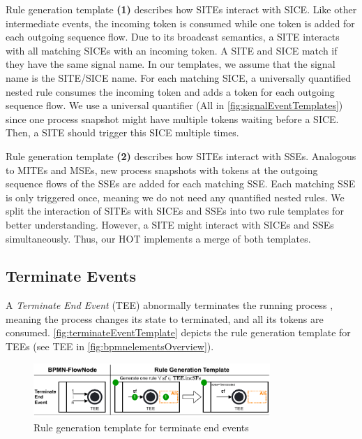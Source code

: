 \documentclass{lmcs} %
\begin{document}
Rule generation template \textbf{(1)} describes how SITEs interact with SICE.
Like other intermediate events, the incoming token is consumed while one token is added for each outgoing sequence flow.
Due to its broadcast semantics, a SITE interacts with all matching SICEs with an incoming token.
A SITE and SICE match if they have the same signal name.
In our templates, we assume that the signal name is the SITE/SICE name.
For each matching SICE, a universally quantified nested rule consumes the incoming token and adds a token for each outgoing sequence flow.
We use a universal quantifier (\textsf{All} in \autoref{fig:signalEventTemplates}) since one process snapshot might have multiple tokens waiting before a SICE.
Then, a SITE should trigger this SICE multiple times.

Rule generation template \textbf{(2)} describes how SITEs interact with SSEs.
Analogous to MITEs and MSEs, new process snapshots with tokens at the outgoing sequence flows of the SSEs are added for each matching SSE.
Each matching SSE is only triggered once, meaning we do not need any quantified nested rules.
We split the interaction of SITEs with SICEs and SSEs into two rule templates for better understanding.
However, a SITE might interact with SICEs and SSEs simultaneously.
Thus, our HOT implements a merge of both templates.

\subsection{Terminate Events}
A \textit{Terminate End Event} (TEE) abnormally terminates the running process \cite{objectmanagementgroupBusinessProcessModel2013}, meaning the process changes its state to terminated, and all its tokens are consumed.
\autoref{fig:terminateEventTemplate} depicts the rule generation template for TEEs (see \textsf{TEE} in \autoref{fig:bpmnelementsOverview}).

\begin{figure}[ht]
    \centering
    \includegraphics[width=0.8\textwidth]{images/terminate_end_event_template.pdf}
    \caption{Rule generation template for terminate end events}
    \label{fig:terminateEventTemplate}
\end{figure}
\end{document}

